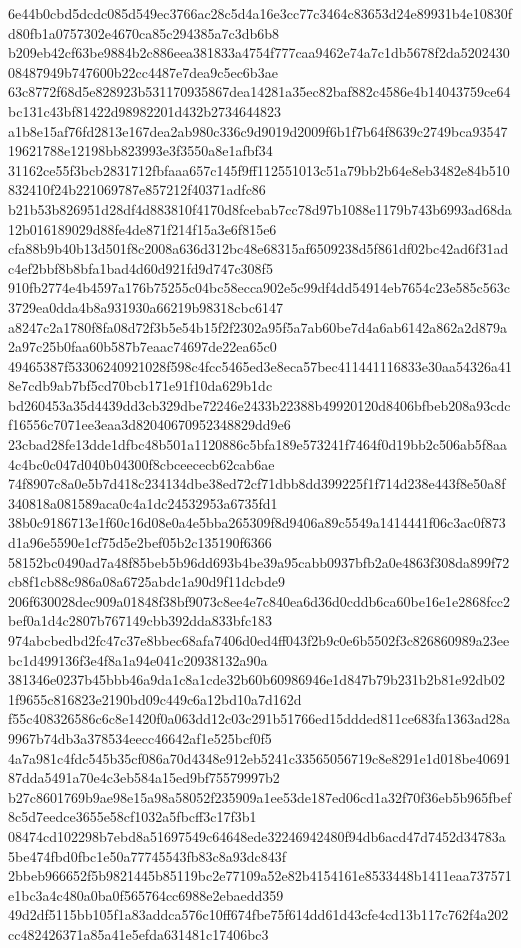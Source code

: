 \documentclass[11pt,a4paper]{article}
\begin{document}
{6e44b0cbd5dcdc085d549ec3766ac28c5d4a16e3cc77c3464c83653d24e89931b4e10830fd80fb1a0757302e4670ca85c294385a7c3db6b8
b209eb42cf63be9884b2c886eea381833a4754f777caa9462e74a7c1db5678f2da520243008487949b747600b22cc4487e7dea9c5ec6b3ae
63c8772f68d5e828923b531170935867dea14281a35ec82baf882c4586e4b14043759ce64bc131c43bf81422d98982201d432b2734644823
a1b8e15af76fd2813e167dea2ab980c336c9d9019d2009f6b1f7b64f8639c2749bca9354719621788e12198bb823993e3f3550a8e1afbf34
31162ce55f3bcb2831712fbfaaa657c145f9ff112551013c51a79bb2b64e8eb3482e84b510832410f24b221069787e857212f40371adfc86
b21b53b826951d28df4d883810f4170d8fcebab7cc78d97b1088e1179b743b6993ad68da12b016189029d88fe4de871f214f15a3e6f815e6
cfa88b9b40b13d501f8c2008a636d312bc48e68315af6509238d5f861df02bc42ad6f31adc4ef2bbf8b8bfa1bad4d60d921fd9d747c308f5
910fb2774e4b4597a176b75255c04bc58ecca902e5c99df4dd54914eb7654c23e585c563c3729ea0dda4b8a931930a66219b98318cbc6147
a8247c2a1780f8fa08d72f3b5e54b15f2f2302a95f5a7ab60be7d4a6ab6142a862a2d879a2a97c25b0faa60b587b7eaac74697de22ea65c0
49465387f53306240921028f598c4fcc5465ed3e8eca57bec411441116833e30aa54326a418e7cdb9ab7bf5cd70bcb171e91f10da629b1dc
bd260453a35d4439dd3cb329dbe72246e2433b22388b49920120d8406bfbeb208a93cdcf16556c7071ee3eaa3d82040670952348829dd9e6
23cbad28fe13dde1dfbc48b501a1120886c5bfa189e573241f7464f0d19bb2c506ab5f8aa4c4bc0c047d040b04300f8cbceececb62cab6ae
74f8907c8a0e5b7d418c234134dbe38ed72cf71dbb8dd399225f1f714d238e443f8e50a8f340818a081589aca0c4a1dc24532953a6735fd1
38b0c9186713e1f60c16d08e0a4e5bba265309f8d9406a89c5549a1414441f06c3ac0f873d1a96e5590e1cf75d5e2bef05b2c135190f6366
58152bc0490ad7a48f85beb5b96dd693b4be39a95cabb0937bfb2a0e4863f308da899f72cb8f1cb88c986a08a6725abdc1a90d9f11dcbde9
206f630028dec909a01848f38bf9073c8ee4e7c840ea6d36d0cddb6ca60be16e1e2868fcc2bef0a1d4c2807b767149cbb392dda833bfc183
974abcbedbd2fc47c37e8bbec68afa7406d0ed4ff043f2b9c0e6b5502f3c826860989a23eebc1d499136f3e4f8a1a94e041c20938132a90a
381346e0237b45bbb46a9da1c8a1cde32b60b60986946e1d847b79b231b2b81e92db021f9655c816823e2190bd09c449c6a12bd10a7d162d
f55c408326586c6c8e1420f0a063dd12c03c291b51766ed15ddded811ce683fa1363ad28a9967b74db3a378534eecc46642af1e525bcf0f5
4a7a981c4fdc545b35cf086a70d4348e912eb5241c33565056719c8e8291e1d018be4069187dda5491a70e4c3eb584a15ed9bf75579997b2
b27c8601769b9ae98e15a98a58052f235909a1ee53de187ed06cd1a32f70f36eb5b965fbef8c5d7eedce3655e58cf1032a5fbcff3c17f3b1
08474cd102298b7ebd8a51697549c64648ede32246942480f94db6acd47d7452d34783a5be474fbd0fbc1e50a77745543fb83c8a93dc843f
2bbeb966652f5b9821445b85119bc2e77109a52e82b4154161e8533448b1411eaa737571e1bc3a4c480a0ba0f565764cc6988e2ebaedd359
49d2df5115bb105f1a83addca576c10ff674fbe75f614dd61d43cfe4cd13b117c762f4a202cc482426371a85a41e5efda631481c17406bc3
}
\end{document}

